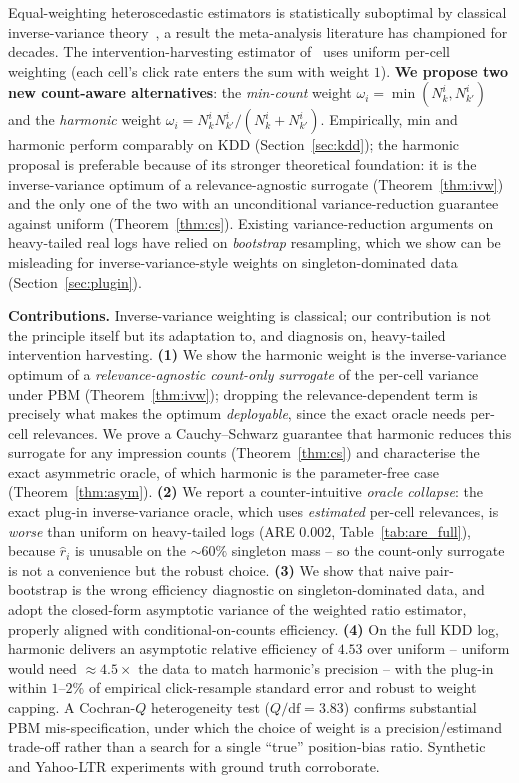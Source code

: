 \documentclass[sigconf]{acmart}
\begin{document}
Equal-weighting heteroscedastic estimators is statistically suboptimal
by classical inverse-variance theory~\cite{borenstein2009meta}, a result
the meta-analysis literature has championed for decades. The intervention-harvesting estimator
of~\cite{agarwal2019estimating} uses uniform per-cell weighting (each
cell's click rate enters the sum with weight $1$). \textbf{We propose
two new count-aware alternatives}: the \emph{min-count} weight
$\omega_i=\min(N_k^i,N_{k'}^i)$ and the \emph{harmonic} weight
$\omega_i=N_k^i N_{k'}^i/(N_k^i+N_{k'}^i)$. Empirically, min and
harmonic perform comparably on KDD (Section~\ref{sec:kdd}); the
harmonic proposal is preferable because of its stronger theoretical
foundation: it is the inverse-variance optimum of a relevance-agnostic
surrogate (Theorem~\ref{thm:ivw}) and the only one of the two with an
unconditional variance-reduction guarantee against uniform
(Theorem~\ref{thm:cs}). Existing variance-reduction arguments on
heavy-tailed real logs have relied on \emph{bootstrap} resampling,
which we show can be misleading for inverse-variance-style weights on
singleton-dominated data (Section~\ref{sec:plugin}).

\textbf{Contributions.} Inverse-variance weighting is classical; our
contribution is not the principle itself but its adaptation to, and
diagnosis on, heavy-tailed intervention harvesting.
\textbf{(1)} We show the harmonic weight is the inverse-variance optimum
of a \emph{relevance-agnostic count-only surrogate} of the per-cell
variance under PBM (Theorem~\ref{thm:ivw}); dropping the
relevance-dependent term is precisely what makes the optimum
\emph{deployable}, since the exact oracle needs per-cell relevances. We
prove a Cauchy--Schwarz guarantee that harmonic reduces this surrogate for
any impression counts (Theorem~\ref{thm:cs}) and characterise the exact
asymmetric oracle, of which harmonic is the parameter-free case
(Theorem~\ref{thm:asym}).
\textbf{(2)} We report a counter-intuitive \emph{oracle collapse}: the
exact plug-in inverse-variance oracle, which uses \emph{estimated}
per-cell relevances, is \emph{worse} than uniform on heavy-tailed logs
(ARE $0.002$, Table~\ref{tab:are_full}), because $\hat r_i$ is unusable on
the ${\sim}60\%$ singleton mass -- so the count-only surrogate is not a
convenience but the robust choice.
\textbf{(3)} We show that naive pair-bootstrap is the wrong efficiency
diagnostic on singleton-dominated data, and adopt the closed-form
asymptotic variance of the weighted ratio estimator, properly aligned with
conditional-on-counts efficiency.
\textbf{(4)} On the full KDD log, harmonic delivers an asymptotic relative
efficiency of $4.53$ over uniform -- uniform would need
${\approx}4.5{\times}$ the data to match harmonic's precision -- with the
plug-in within $1$--$2\%$ of empirical click-resample standard error and
robust to weight capping. A Cochran-$Q$ heterogeneity test
($Q/\mathrm{df}=3.83$) confirms substantial PBM mis-specification, under
which the choice of weight is a precision/estimand trade-off rather than a
search for a single ``true'' position-bias ratio. Synthetic and Yahoo-LTR
experiments with ground truth corroborate.
\end{document}
